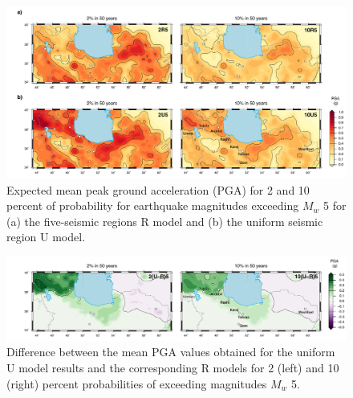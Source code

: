 \begin{figure}[t]
    \centering
    \includegraphics[width=\textwidth]{figures/pdf/figure-08.pdf} 
    \caption{Expected mean peak ground acceleration (PGA) for 2 and 10 percent of probability for earthquake magnitudes exceeding $M_w$ 5 for (a) the five-seismic regions R model and (b) the uniform seismic region U model.}
    \label{fig:pga}
\end{figure}

\begin{figure}[t]
    \centering
    \includegraphics[width=\textwidth]{figures/pdf/figure-09.pdf} 
    \caption{Difference between the mean PGA values obtained for the uniform U model results and the corresponding R models for 2 (left) and 10 (right) percent probabilities of exceeding magnitudes $M_w$ 5.}
    \label{fig:pga.diff}
\end{figure}

